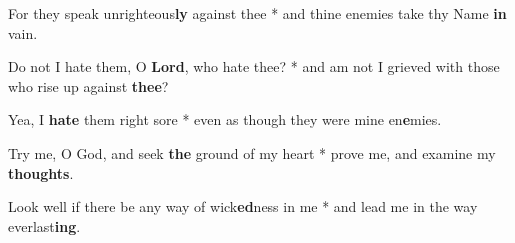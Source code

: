 \begin{multicols}{2}
	For they speak unrighteous\textbf{ly} against thee * and thine enemies take thy Name \textbf{in} vain.
	
	Do not I hate them, O \textbf{Lord}, who hate thee? * and am not I grieved with those who rise up against \textbf{thee}?
	
	Yea, I \textbf{hate} them right sore * even as though they were mine en\textbf{e}mies.
	
	Try me, O God, and seek \textbf{the} ground of my heart * prove me, and examine my \textbf{thoughts}.
	
	Look well if there be any way of wick\textbf{ed}ness in me * and lead me in the way everlast\textbf{ing}.
\end{multicols}